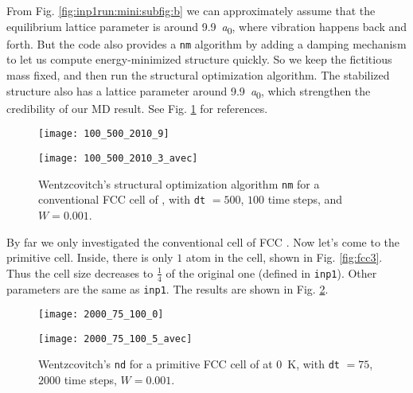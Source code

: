 From Fig. \ref{fig:inp1run:mini:subfig:b} we can approximately assume that the equilibrium
lattice parameter is around \SI{9.9}{\bohr}, where vibration happens back and forth.
But the code also provides a \texttt{nm} algorithm by adding a damping mechanism 
to let us compute energy-minimized structure quickly. So we keep the fictitious mass fixed,
and then run the structural optimization algorithm. The stabilized structure also has a
lattice parameter around \SI{9.9}{\bohr}, which strengthen the credibility of our MD result. 
See Fig. \ref{fig:inp5} for references.

\begin{figure}[H]
  \begin{minipage}[t]{0.48\textwidth}
    \centering
    \texttt{[image: 100\_500\_2010\_9]}
    \label{fig:inp5:mini:subfig:a}   %
  \end{minipage}
  \hfill
  \begin{minipage}[t]{0.48\textwidth}
    \centering
    \texttt{[image: 100\_500\_2010\_3\_avec]}
    \label{fig:inp5:mini:subfig:b}   %
  \end{minipage}
  \caption{Wentzcovitch's structural optimization algorithm \texttt{nm} for a conventional FCC cell of , with \texttt{dt} $=500$, $100$ time steps, and $W = 0.001$.}
  \label{fig:inp5}   %
\end{figure}

By far we only investigated the conventional cell of FCC .
Now let's come to the primitive cell. Inside, 
there is only $1$  atom in the cell, shown in Fig. \ref{fig:fcc3}. Thus the cell size decreases to $\frac{ 1 }{ 4 }$ of the original one (defined in \texttt{inp1}).
Other parameters are the same as \texttt{inp1}.
The results are shown in Fig. \ref{fig:inp3run}.

\begin{figure}[H]
  \begin{minipage}[t]{0.48\textwidth}
    \centering
    \texttt{[image: 2000\_75\_100\_0]}
    \label{fig:inp3run:mini:subfig:a}   %
  \end{minipage}
  \hfill
  \begin{minipage}[t]{0.48\textwidth}
    \centering
    \texttt{[image: 2000\_75\_100\_5\_avec]}
    \label{fig:inp3run:mini:subfig:b}   %
  \end{minipage}
  \caption{Wentzcovitch's \texttt{nd} for a primitive FCC cell of  at \SI{0}{\kelvin}, with \texttt{dt} $=75$, $2000$ time steps, $W = 0.001$.}
  \label{fig:inp3run}   %
\end{figure}

